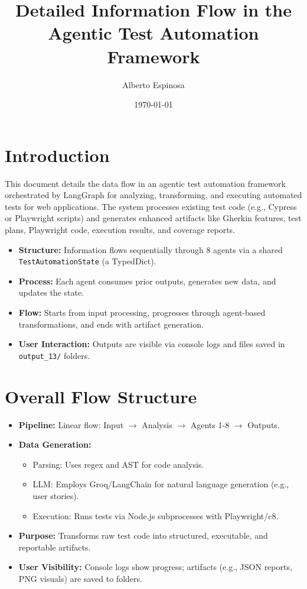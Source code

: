 \documentclass{article}
\title{Detailed Information Flow in the Agentic Test Automation Framework}
\author{Alberto Espinosa}
\date{\today}
\begin{document}
\maketitle

\section{Introduction}
This document details the data flow in an agentic test automation framework orchestrated by LangGraph for analyzing, transforming, and executing automated tests for web applications. The system processes existing test code (e.g., Cypress or Playwright scripts) and generates enhanced artifacts like Gherkin features, test plans, Playwright code, execution results, and coverage reports.

\begin{itemize}
    \item \textbf{Structure:} Information flows sequentially through 8 agents via a shared \texttt{TestAutomationState} (a TypedDict).
    \item \textbf{Process:} Each agent consumes prior outputs, generates new data, and updates the state.
    \item \textbf{Flow:} Starts from input processing, progresses through agent-based transformations, and ends with artifact generation.
    \item \textbf{User Interaction:} Outputs are visible via console logs and files saved in \texttt{output\_13/} folders.
\end{itemize}

\section{Overall Flow Structure}
\begin{itemize}
    \item \textbf{Pipeline:} Linear flow: Input $\rightarrow$ Analysis $\rightarrow$ Agents 1-8 $\rightarrow$ Outputs.
    \item \textbf{Data Generation:}
        \begin{itemize}
            \item Parsing: Uses regex and AST for code analysis.
            \item LLM: Employs Groq/LangChain for natural language generation (e.g., user stories).
            \item Execution: Runs tests via Node.js subprocesses with Playwright/c8.
        \end{itemize}
    \item \textbf{Purpose:} Transforms raw test code into structured, executable, and reportable artifacts.
    \item \textbf{User Visibility:} Console logs show progress; artifacts (e.g., JSON reports, PNG visuals) are saved to folders.
\end{itemize}
\end{document}
